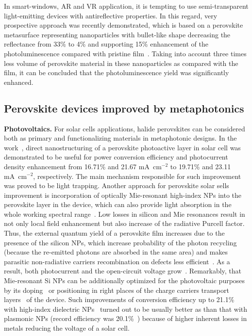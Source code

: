 \documentclass[journal=chreay,manuscript=review]{achemso}
\begin{document}

In smart-windows, AR and VR application, it is tempting to use semi-transparent light-emitting devices with antireflective properties. In this regard, very prospective approach was recently demonstrated, which is based on a perovskite metasurface representing nanoparticles with bullet-like shape decreasing the reflectance from 33\% to 4\% and supporting 15\% enhancement of the photoluminescence compared with pristine film~\citep{baryshnikova2020broadband}. Taking into account three times less volume of perovskite material in these nanoparticles as compared with the film, it can be concluded that the photoluminescence yield was significantly enhanced.

\subsection{Perovskite devices improved by metaphotonics}

\textbf{Photovoltaics.}
For solar cells applications, halide perovskites can be considered both as primary and functionalizing materials in metaphotonic designs. In the work~\cite{wang2018diffraction}, direct nanostructuring of a perovskite photoactive layer in solar cell was demonstrated to be useful for power conversion efficiency and photocurrent density enhancement from 16.71\% and 21.67 mA~cm$^{-2}$ to 19.71\% and 23.11 mA~cm$^{-2}$, respectively. The main mechanism responsible for such improvement was proved to be light trapping. Another approach for perovskite solar sells improvement is incorporation of optically Mie-resonant high-index NPs into the perovskite layer in the device, which can also provide light absorption in the whole working spectral range~\cite{furasova2018resonant}. Low losses in silicon and Mie resonances result in not only local field enhancement but also increase of the radiative Purcell factor. Thus, the external quantum yield of a perovskite film increases due to the presence of the silicon NPs, which increase probability of the photon recycling (because the re-emitted photons are absorbed in the same area) and makes parasitic non-radiative carriers recombination on defects less efficient~\cite{dequilettes2019charge}. As a result, both photocurrent and the open-circuit voltage grow~\cite{furasova2018resonant}. Remarkably, that Mie-resonant Si NPs can be additionally optimized for the photovoltaic purposes by its doping~\cite{furasova2020engineering} or positioning in right places of the charge carriers transport layers~\cite{furasova2021mie}   of the device. Such improvements of conversion efficiency up to 21.1\% with high-index dielectric NPs~\cite{furasova2021mie} turned out to be usually better as than that with plasmonic NPs (record efficiency was 20.1\%~\cite{zhao2020enhanced}) because of higher inherent losses in metals reducing the voltage of a solar cell.
\end{document}
